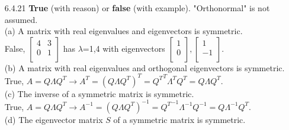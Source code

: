 \documentclass[10pt,twoside,reqno]{article}
\begin{document}
\begin{enumerate}
\vspace{3mm}
\item[6.4.21] \textbf{True} (with reason) or \textbf{false} (with example). "Orthonormal" is not assumed. \\ \vspace{2mm}
{\addtolength{\leftskip}{10mm}
(a) A matrix with real eigenvalues and eigenvectors is symmetric.\\ \vspace{2mm}
{\addtolength{\leftskip}{5mm}
False,
$
\begin{bmatrix}
4&3\\
0&1\\
\end{bmatrix}
$
has $\lambda$=1,4 with eigenvectors 
$
\begin{bmatrix}
1\\
0\\
\end{bmatrix},
\begin{bmatrix}
1\\
-1\\
\end{bmatrix}
$. \\
}
\vspace{3mm}
(b) A matrix with real eigenvalues and orthogonal eigenvectors is symmetric.\\ \vspace{2mm}
{\addtolength{\leftskip}{5mm}
True, $A=Q \Lambda Q^T \rightarrow A^T=(Q \Lambda Q^T)^T={Q^T}^T \Lambda^T Q^T=Q \Lambda Q^T$. \\
}
\vspace{3mm}
(c) The inverse of a symmetric matrix is symmetric.\\ \vspace{2mm}
{\addtolength{\leftskip}{5mm}
True, $A=Q \Lambda Q^T \rightarrow A^{-1}=(Q \Lambda Q^T)^{-1}={Q^T}^{-1} \Lambda^{-1} Q^{-1}=Q \Lambda^{-1} Q^T$. \\
}
\vspace{3mm}
(d) The eigenvector matrix $S$ of a symmetric matrix is symmetric.\\ \vspace{2mm}
}
\end{enumerate}
\end{document}
